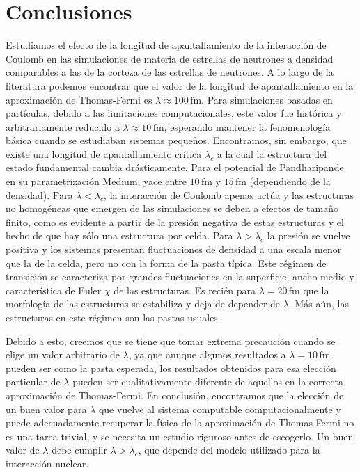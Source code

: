 \section{Conclusiones}\label{concluding}

Estudiamos el efecto de la longitud de apantallamiento de la interacción de Coulomb en las simulaciones de materia de estrellas de neutrones a densidad comparables a las de la corteza de las estrellas de neutrones.
A lo largo de la literatura podemos encontrar que el valor de la longitud de apantallamiento en la aproximación de Thomas-Fermi es $\lambda\approx100\,\text{fm}$.
Para simulaciones basadas en partículas, debido a las limitaciones computacionales, este valor fue histórica y arbitrariamente reducido a $\lambda\approx10\,\text{fm}$, esperando mantener la fenomenología básica cuando se estudiaban sistemas pequeños.
Encontramos, sin embargo, que existe una longitud de apantallamiento crítica $\lambda_c$ a la cual la estructura del estado fundamental cambia drásticamente.
Para el potencial de Pandharipande en su parametrización Medium, yace entre $10\,\text{fm}$ y $15\,\text{fm}$ (dependiendo de la densidad).
Para $\lambda<\lambda_c$, la interacción de Coulomb apenas actúa y las estructuras no homogéneas que emergen de las simulaciones se deben a efectos de tamaño finito, como es evidente a partir de la presión negativa de estas estructuras y el hecho de que hay sólo una estructura por celda.
Para $\lambda>\lambda_c$ la presión se vuelve positiva y los sistemas presentan fluctuaciones de densidad a una escala menor que la de la celda, pero no con la forma de la pasta típica.
Este régimen de transición se caracteriza por grandes fluctuaciones en la superficie, ancho medio y característica de Euler $\chi$ de las estructuras.
Es recién para $\lambda=20\,\text{fm}$ que la morfología de las estructuras se estabiliza y deja de depender de $\lambda$.
Más aún, las estructuras en este régimen son las pastas usuales.

Debido a esto, creemos que se tiene que tomar extrema precaución cuando se elige un valor arbitrario de $\lambda$, ya que aunque algunos resultados a $\lambda=10\,\text{fm}$ pueden ser como la pasta esperada, los resultados obtenidos para esa elección particular de $\lambda$ pueden ser cualitativamente diferente de aquellos en la correcta aproximación de Thomas-Fermi.
En conclusión, encontramos que la elección de un buen valor para $\lambda$ que vuelve al sistema computable computacionalmente y puede adecuadamente recuperar la física de la aproximación de Thomas-Fermi no es una tarea trivial, y se necesita un estudio riguroso antes de escogerlo.
Un buen valor de $\lambda$ debe cumplir $\lambda>\lambda_c$, que depende del modelo utilizado para la interacción nuclear.


